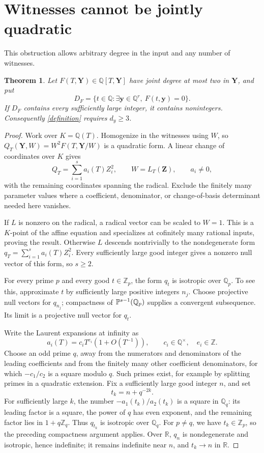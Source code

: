 \documentclass[11pt]{article}
\newtheorem{theorem}{Theorem}[section]
\theoremstyle{remark}\newtheorem{remark}[theorem]{Remark}
\newcommand{\Q}{\mathbb Q}\newcommand{\Z}{\mathbb Z}\newcommand{\R}{\mathbb R}
\begin{document}
\section{Witnesses cannot be jointly quadratic}

This obstruction allows arbitrary degree in the input and any number of witnesses.

\begin{theorem}\label{quadratic-fibre}
Let \(F(T,\mathbf Y)\in\Q[T,\mathbf Y]\) have joint degree at most two in \(\mathbf Y\), and put
\[
 D_F=\{t\in\Q:\exists\mathbf y\in\Q^r,\ F(t,\mathbf y)=0\}.
\]
If \(D_F\) contains every sufficiently large integer, it contains nonintegers. Consequently \eqref{definition} requires \(d_y\ge3\).
\end{theorem}
\begin{proof}
Work over \(K=\Q(T)\). Homogenize in the witnesses using \(W\), so
\(Q_T(\mathbf Y,W)=W^2F(T,\mathbf Y/W)\) is a quadratic form. A linear change of coordinates over \(K\) gives
\[
 Q_T=\sum_{i=1}^s a_i(T)Z_i^2,\qquad W=L_T(\mathbf Z),\qquad a_i\ne0,
\]
with the remaining coordinates spanning the radical. Exclude the finitely many parameter values where a coefficient, denominator, or change-of-basis determinant needed here vanishes.

If \(L\) is nonzero on the radical, a radical vector can be scaled to \(W=1\). This is a \(K\)-point of the affine equation and specializes at cofinitely many rational inputs, proving the result. Otherwise \(L\) descends nontrivially to the nondegenerate form
\(q_T=\sum_{i=1}^s a_i(T)Z_i^2\). Every sufficiently large good integer gives a nonzero null vector of this form, so \(s\ge2\).

For every prime \(p\) and every good \(t\in\Z_p\), the form \(q_t\) is isotropic over \(\Q_p\). To see this, approximate \(t\) by sufficiently large positive integers \(n_j\). Choose projective null vectors for \(q_{n_j}\); compactness of \(\PP^{s-1}(\Q_p)\) supplies a convergent subsequence. Its limit is a projective null vector for \(q_t\).

Write the Laurent expansions at infinity as
\[
 a_i(T)=c_iT^{e_i}(1+O(T^{-1})),\qquad c_i\in\Q^\times,\quad e_i\in\Z.
\]
Choose an odd prime \(q\), away from the numerators and denominators of the leading coefficients and from the finitely many other coefficient denominators, for which \(-c_1/c_2\) is a square modulo \(q\). Such primes exist, for example by splitting primes in a quadratic extension. Fix a sufficiently large good integer \(n\), and set
\[
 t_k=n+q^{-2k}.
\]
For sufficiently large \(k\), the number \(-a_1(t_k)/a_2(t_k)\) is a square in \(\Q_q\): its leading factor is a square, the power of \(q\) has even exponent, and the remaining factor lies in \(1+q\Z_q\). Thus \(q_{t_k}\) is isotropic over \(\Q_q\). For \(p\ne q\), we have \(t_k\in\Z_p\), so the preceding compactness argument applies. Over \(\R\), \(q_n\) is nondegenerate and isotropic, hence indefinite; it remains indefinite near \(n\), and \(t_k\to n\) in \(\R\).


\end{proof}
\end{document}
